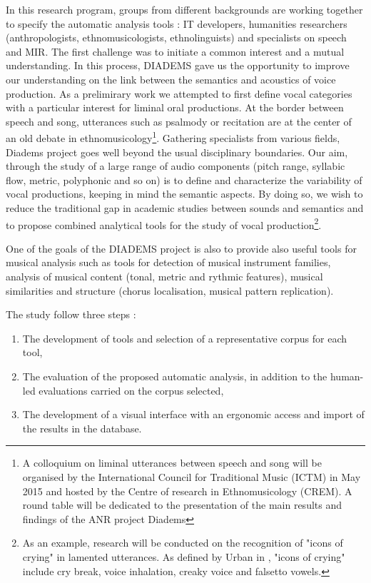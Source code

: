 \documentclass{sig-alternate}
\begin{document}
In this research program, groups from different backgrounds are working together to specify the automatic analysis tools :  IT developers, humanities researchers (anthropologists, ethnomusicologists, ethnolinguists) and specialists on speech and MIR. The first challenge was to initiate a common interest and a mutual understanding. In this process, DIADEMS gave us the opportunity  to improve our understanding on the link between the semantics and acoustics of voice production. As a prelimirary work we attempted to first define vocal categories with a particular interest for liminal oral productions. At the border between speech and song, utterances such as psalmody or recitation are at the center of an old debate in ethnomusicology\footnote{A colloquium on liminal utterances between speech and song will be organised by the International Council for Traditional Music (ICTM) in May 2015 and hosted by the Centre of research in Ethnomusicology (CREM). A round table will be dedicated to the presentation of the main results and findings of the ANR project Diadems}. Gathering specialists from various fields, Diadems project goes well beyond the usual disciplinary boundaries. Our aim, through the study of a large range of audio components (pitch range, syllabic flow, metric, polyphonic and so on) is to define and characterize the variability of vocal productions, keeping in mind the semantic aspects. By doing so, we wish to reduce the traditional gap in academic studies between sounds and semantics and to propose combined analytical tools for the study of vocal production\footnote{As an example, research will be conducted on the recognition of "icons of crying" 
in lamented utterances. As defined by Urban in \cite{Urban88}, "icons of crying" include cry break, voice inhalation, creaky voice and falsetto vowels.}. 

One of the goals of the DIADEMS project is also to provide also useful tools for musical analysis such as tools for detection of musical instrument families, analysis of musical content (tonal, metric and rythmic features), musical similarities and structure (chorus localisation, musical pattern replication).

The study follow three steps : 
\begin{enumerate}
\item The development of tools and selection of a representative corpus
  for each tool,
\item The evaluation of the proposed automatic analysis, in addition to
  the human-led evaluations carried on the corpus selected,
\item The development of a visual interface with an ergonomic access and
  import of the results in the database.
\end{enumerate}
\end{document}
